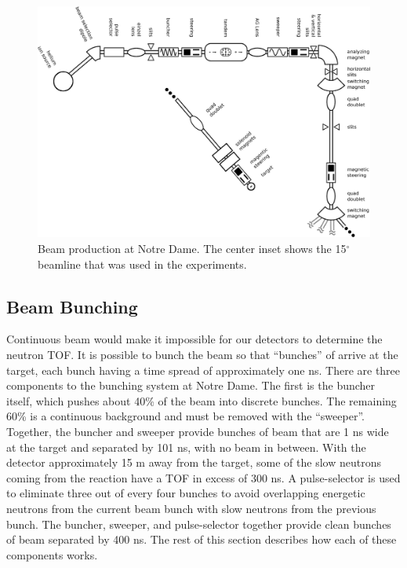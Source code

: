 \begin{figure}[htp]
\centering
\includegraphics[width=1.0\textwidth]{figures/NSL_beamline.eps}
\caption{Beam production at Notre Dame.  The center inset shows the 15$^{\circ}$ beamline that was used in the experiments.}
\label{fig:beamline}
\end{figure}

\subsection{Beam Bunching}

Continuous beam would make it impossible for our detectors to determine the neutron TOF.  It is possible to bunch the beam so that ``bunches'' of  arrive at the target, each bunch having a time spread of approximately one ns. There are three components to the bunching system at Notre Dame.  The first is the buncher itself, which pushes about 40\% of the beam into discrete bunches.  The remaining 60\% is a continuous background and must be removed with the ``sweeper''.  Together, the buncher and sweeper provide bunches of beam that are 1 ns wide at the target and separated by 101 ns, with no beam in between.  With the detector approximately 15 m away from the target, some of the slow neutrons coming from the reaction have a TOF in excess of 300 ns.  A pulse-selector is used to eliminate three out of every four bunches to avoid overlapping energetic neutrons from the current beam bunch with slow neutrons from the previous bunch.  The buncher, sweeper, and pulse-selector together provide clean bunches of beam separated by 400 ns.  The rest of this section describes how each of these components works.

